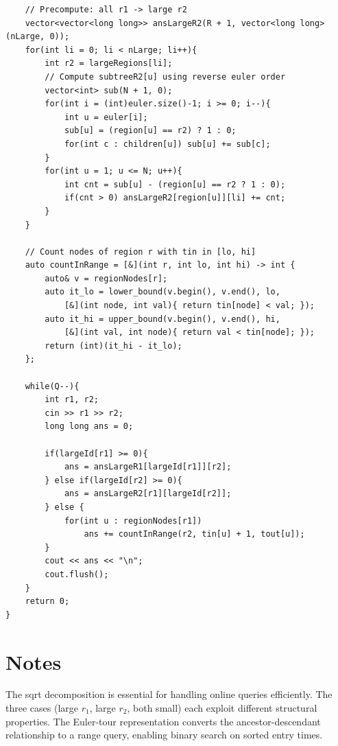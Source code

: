 \documentclass[11pt,a4paper]{article}
\begin{document}
\begin{lstlisting}
    // Precompute: all r1 -> large r2
    vector<vector<long long>> ansLargeR2(R + 1, vector<long long>(nLarge, 0));
    for(int li = 0; li < nLarge; li++){
        int r2 = largeRegions[li];
        // Compute subtreeR2[u] using reverse euler order
        vector<int> sub(N + 1, 0);
        for(int i = (int)euler.size()-1; i >= 0; i--){
            int u = euler[i];
            sub[u] = (region[u] == r2) ? 1 : 0;
            for(int c : children[u]) sub[u] += sub[c];
        }
        for(int u = 1; u <= N; u++){
            int cnt = sub[u] - (region[u] == r2 ? 1 : 0);
            if(cnt > 0) ansLargeR2[region[u]][li] += cnt;
        }
    }

    // Count nodes of region r with tin in [lo, hi]
    auto countInRange = [&](int r, int lo, int hi) -> int {
        auto& v = regionNodes[r];
        auto it_lo = lower_bound(v.begin(), v.end(), lo,
            [&](int node, int val){ return tin[node] < val; });
        auto it_hi = upper_bound(v.begin(), v.end(), hi,
            [&](int val, int node){ return val < tin[node]; });
        return (int)(it_hi - it_lo);
    };

    while(Q--){
        int r1, r2;
        cin >> r1 >> r2;
        long long ans = 0;

        if(largeId[r1] >= 0){
            ans = ansLargeR1[largeId[r1]][r2];
        } else if(largeId[r2] >= 0){
            ans = ansLargeR2[r1][largeId[r2]];
        } else {
            for(int u : regionNodes[r1])
                ans += countInRange(r2, tin[u] + 1, tout[u]);
        }
        cout << ans << "\n";
        cout.flush();
    }
    return 0;
}
\end{lstlisting}

\section{Notes}
The sqrt decomposition is essential for handling online queries efficiently. The three cases (large $r_1$, large $r_2$, both small) each exploit different structural properties. The Euler-tour representation converts the ancestor-descendant relationship to a range query, enabling binary search on sorted entry times.
\end{document}
